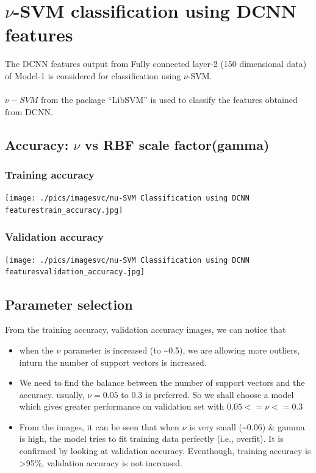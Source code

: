 \documentclass[fleqn]{article}
\begin{document}
\newpage
\section{$\nu$-SVM classification using DCNN features}
The DCNN features output from Fully connected layer-2 (150 dimensional data) of Model-1 is considered for classification using $\nu$-SVM.\\\\
$\nu-SVM$ from the package ``LibSVM'' is used to classify the features obtained from DCNN.

\subsection{Accuracy: $\nu$ vs RBF scale factor(gamma)}
\subsubsection{Training accuracy}
\texttt{[image: ./pics/imagesvc/nu-SVM Classification using DCNN featurestrain\_accuracy.jpg]}\\
\subsubsection{Validation accuracy}
\texttt{[image: ./pics/imagesvc/nu-SVM Classification using DCNN featuresvalidation\_accuracy.jpg]}\\

\subsection{Parameter selection}
From the training accuracy, validation accuracy images, we can notice that

\begin{itemize}
  \item when the $\nu$ parameter is increased (to \textasciitilde0.5), we are allowing more outliers, inturn the number of support vectors is increased.
  \item We need to find the balance between the number of support vectors and the accuracy. 
  usually, $\nu = 0.05$ to $0.3$ is preferred. So we shall choose a model which gives greater performance on validation set with $0.05 <= \nu <= 0.3$ 
  \item From the images, it can be seen that when $\nu$ is very small (\textasciitilde0.06) \& gamma is high, the model tries to fit training data perfectly (i.e., overfit).
  It is confirmed by looking at validation accuracy. Eventhough, training accuracy is >95\%, validation accuracy is not increased. 
\end{itemize}
\end{document}

